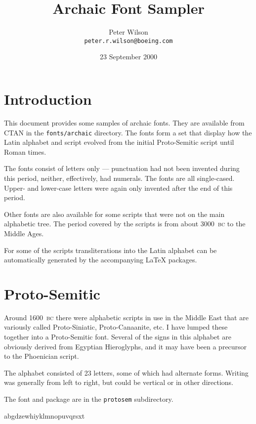 \documentclass{article}
\title{Archaic Font Sampler}
\author{Peter Wilson\\ \texttt{peter.r.wilson@boeing.com}}
\date{23 September 2000}
\newcommand{\BC}{\textsc{bc}}
\begin{document}
\maketitle
\tableofcontents

\clearpage
\section{Introduction}

    This document provides some samples of archaic fonts. They are
available from CTAN in the \texttt{fonts/archaic} directory. The fonts
form a set that display how the Latin alphabet and script evolved from the
initial Proto-Semitic script until Roman times.

    The fonts consist of letters only --- punctuation had not been invented
during this period, neither, effectively, had numerals. The fonts are all
single-cased. Upper- and lower-case letters were again only invented after
the end of this period.

    Other fonts are also available for some scripts that were not on the
main alphabetic tree. The period covered by the scripts is from about 
3000~\BC{} to the Middle Ages.

    For some of the scripts transliterations into the Latin alphabet can
be automatically generated by the accompanying LaTeX packages.

\clearpage


\section{Proto-Semitic}

    Around 1600~\BC{} there were alphabetic scripts in use in the Middle East
that are variously called Proto-Siniatic, Proto-Canaanite, etc. I
have lumped these together into a Proto-Semitic font. Several
of the signs in this alphabet are obviously derived from Egyptian
Hieroglyphs, and it may have been a precursor to the Phoenician script.

    The alphabet consisted of 23 letters, some of which had alternate
forms. Writing was generally from left to right, but could be vertical
or in other directions.

    The font and package are in the \texttt{protosem} subdirectory.

\begin{center}
\protofamily
abgdzewhiyklmnopuvqrsxt
\end{center}
\end{document}
